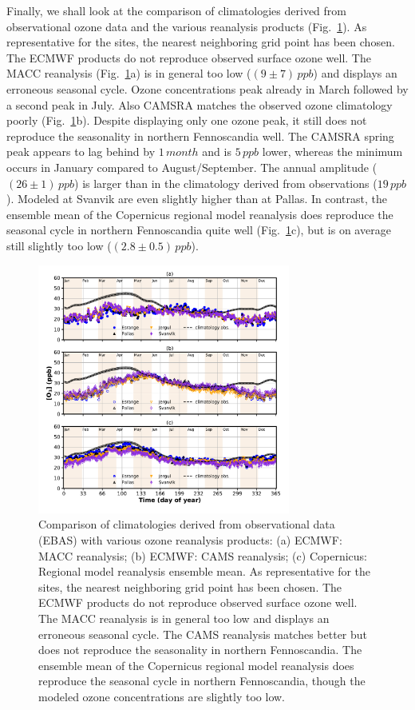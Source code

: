 \documentclass[bg, manuscript]{copernicus}
\begin{document}
Finally, we shall look at the comparison of climatologies derived from observational ozone data and the various reanalysis products (Fig.~\ref{fig:ozone_climatologies}). As representative for the sites, the nearest neighboring grid point has been chosen. The ECMWF products do not reproduce observed surface ozone well. The MACC reanalysis (Fig.~\ref{fig:ozone_climatologies}a) is in general too low ($(9\pm 7)\,\unit{ppb}$) and displays an erroneous seasonal cycle. Ozone concentrations peak already in March followed by a second peak in July. Also CAMSRA matches the observed ozone climatology poorly (Fig.~\ref{fig:ozone_climatologies}b). Despite displaying only one ozone peak, it still does not reproduce the seasonality in northern Fennoscandia well. The CAMSRA spring peak appears to lag behind by $1\,\unit{month}$ and is $5\,\unit{ppb}$ lower, whereas the minimum occurs in January compared to August/September. The annual amplitude ($(26\pm 1)\,\unit{ppb}$) is larger than in the climatology derived from observations ($19\,\unit{ppb}$). Modeled \chem{[O_3]} at Svanvik are even slightly higher than at Pallas. In contrast, the ensemble mean of the Copernicus regional model reanalysis does reproduce the seasonal cycle in northern Fennoscandia quite well (Fig.~\ref{fig:ozone_climatologies}c), but is on average still slightly too low ($(2.8\pm 0.5)\,\unit{ppb}$).

\begin{figure}[t]
  \includegraphics[width=8.3cm]{fig07}
  \caption{Comparison of climatologies derived from observational data (EBAS) with various ozone reanalysis products: (a) ECMWF: MACC reanalysis; (b) ECMWF: CAMS reanalysis; (c) Copernicus: Regional model reanalysis ensemble mean. As representative for the sites, the nearest neighboring grid point has been chosen. The ECMWF products do not reproduce observed surface ozone well. The MACC reanalysis is in general too low and displays an erroneous seasonal cycle. The CAMS reanalysis matches better but does not reproduce the seasonality in northern Fennoscandia. The ensemble mean of the Copernicus regional model reanalysis does reproduce the seasonal cycle in northern Fennoscandia, though the modeled ozone concentrations are slightly too low.}
  \label{fig:ozone_climatologies}
\end{figure}
\end{document}
